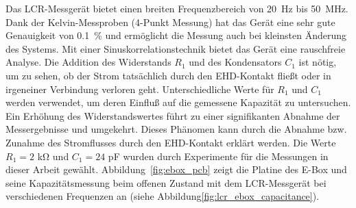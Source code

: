 Das LCR-Messgerät bietet einen breiten Frequenzbereich von \SI{20}{\Hz} bis \SI{50}{\MHz}.
Dank der Kelvin-Messproben (4-Punkt Messung) hat das Gerät eine sehr gute Genauigkeit von \SI{0.1}{\percent} und ermöglicht die Messung auch bei kleinsten Änderung des Systems.
Mit einer Sinuskorrelationstechnik bietet das Gerät eine rauschfreie Analyse.
Die Addition des Widerstands $R_1$ und des Kondensators $C_1$ ist nötig, um zu sehen, ob der Strom tatsächlich durch den EHD-Kontakt fließt oder in irgeneiner Verbindung verloren geht.
Unterschiedliche Werte für $R_1$ und $C_1$ werden verwendet, um deren Einfluß auf die gemessene Kapazität zu untersuchen.
Ein Erhöhung des Widerstandswertes führt zu einer signifikanten Abnahme der Messergebnisse und umgekehrt.
Dieses Phänomen kann durch die Abnahme bzw. Zunahme des Stromflusses durch den EHD-Kontakt erklärt werden.
Die Werte $R_1 = 2$ \si{\kilo\ohm} und $C_1 = 24$ \si{\pico\farad} wurden durch Experimente für die Messungen in dieser Arbeit gewählt.
Abbildung~\ref{fig:ebox_pcb} zeigt die Platine des E-Box und seine Kapazitätsmessung beim offenen Zustand mit dem LCR-Messgerät bei verschiedenen Frequenzen an (siehe Abbildung\ref{fig:lcr_ebox_capacitance}).

